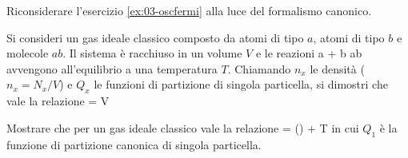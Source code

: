 \begin{Exercise}[title={Oscillatori di Fermi, la vendetta canonica},
label={ex:04-oscfermi}]
Riconsiderare l'esercizio \ref{ex:03-oscfermi} alla luce del formalismo canonico.
\end{Exercise}

\begin{Exercise}[title={Equilibrio chimico},label={ex:04-eqchim}]
Si consideri un gas ideale classico composto da atomi di tipo $a$, atomi di tipo $b$ e molecole $ab$. Il sistema è racchiuso in un volume $V$ e le reazioni
\be
a + b \rightleftharpoons ab
\ee
avvengono all'equilibrio a una temperatura $T$. Chiamando $n_x$ le densità ($n_x = N_x/V$) e $Q_x$ le funzioni di partizione di singola particella, si dimostri che vale la relazione
\be
{} = V
\ee
\end{Exercise}

\begin{Exercise}[title={Entropia di un gas ideale classico},label={ex:04-esps}]
Mostrare che per un gas ideale classico vale la relazione
\be
{} = \ln\left(\right) + T
\ee
in cui $Q_1$ è la funzione di partizione canonica di singola particella.
\end{Exercise}

